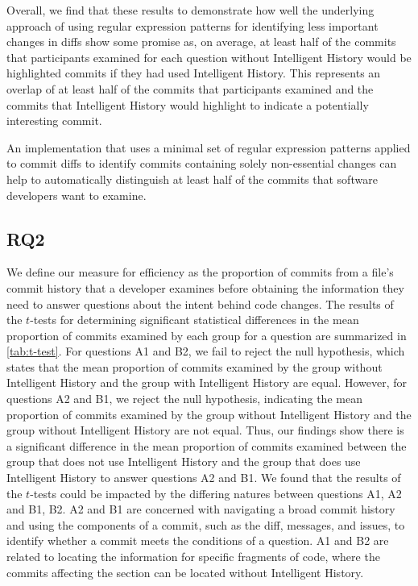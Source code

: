Overall, we find that these results to demonstrate how well the underlying approach of using regular expression
patterns for identifying less important changes in diffs show some promise as, on average,
at least half of the commits that participants examined for each question without Intelligent History
would be highlighted commits if they had used Intelligent History.
This represents an overlap of at least half of the commits that participants examined and the commits
that Intelligent History would highlight to indicate a potentially interesting commit.

\begin{summary}[RQ1]
  An implementation that uses a minimal set of regular expression patterns 
  applied to commit diffs to identify commits containing solely non-essential changes can help to
  automatically distinguish at least half of the commits that software
  developers want to examine.
\end{summary}


\subsection{RQ2}
\label{subsec:RQ2}


We define our measure for efficiency as the proportion of commits from a file's commit history 
that a developer examines before obtaining the information they need to answer questions about the intent behind code changes.
The results of the $t$-tests for determining significant statistical differences in 
the mean proportion of commits examined by each group for a question are summarized in \autoref{tab:t-test}.
For questions A1 and B2, we fail to reject the null hypothesis, which states that the mean proportion of commits examined 
by the group without Intelligent History and the group with Intelligent History are equal.
However, for questions A2 and B1, we reject the null hypothesis, indicating the mean proportion of commits examined 
by the group without Intelligent History and the group without Intelligent History are not equal.
Thus, our findings show there is a significant difference in the mean proportion of commits examined between 
the group that does not use Intelligent History and the group that does use Intelligent History to answer questions A2 and B1.
We found that the results of the $t$-tests could be impacted by the differing natures between questions A1, A2 and B1, B2.
A2 and B1 are concerned with navigating a broad commit history and using the components of a commit, such
as the diff, messages, and issues, to identify whether a commit meets the conditions of a question.
A1 and B2 are related to locating the information for specific fragments of code,
where the commits affecting the section can be located without Intelligent History. 


